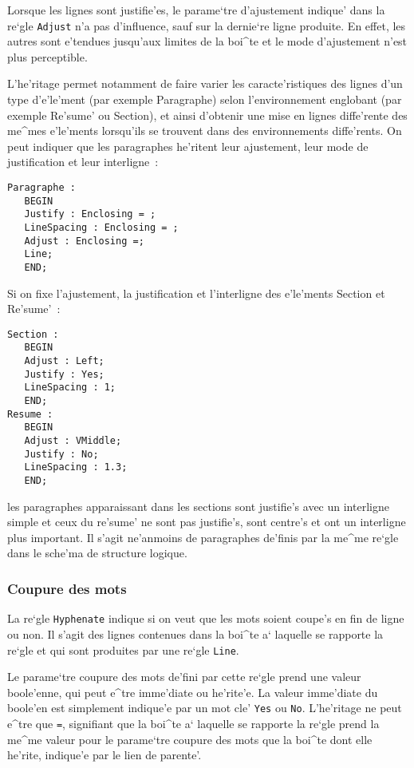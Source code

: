 {Lorsque les lignes sont justifie'es, le parame`tre d'ajustement indique' dans
la re`gle {\tt Adjust} n'a pas d'influence, sauf sur la dernie`re ligne
produite. En effet, les autres sont e'tendues jusqu'aux limites de la boi^te
et le mode d'ajustement n'est plus perceptible.

\begin{example}
L'he'ritage permet notamment de faire varier les caracte'ristiques des
lignes d'un type d'e'le'ment (par exemple Paragraphe) selon l'environnement
englobant (par exemple Re'sume' ou Section), et ainsi d'obtenir une mise
en lignes diffe'rente des me^mes e'le'ments lorsqu'ils se trouvent dans des
environnements diffe'rents. On peut indiquer que les paragraphes he'ritent
leur ajustement, leur mode de justification et leur interligne~:
\begin{verbatim}
Paragraphe :
   BEGIN
   Justify : Enclosing = ;
   LineSpacing : Enclosing = ;
   Adjust : Enclosing =;
   Line;
   END;
\end{verbatim}
Si on fixe l'ajustement, la justification et l'interligne des e'le'ments
Section et Re'sume'~:
\begin{verbatim}
Section :
   BEGIN
   Adjust : Left;
   Justify : Yes;
   LineSpacing : 1;
   END;
Resume :
   BEGIN
   Adjust : VMiddle;
   Justify : No;
   LineSpacing : 1.3;
   END;
\end{verbatim}
les paragraphes apparaissant dans les sections sont justifie's avec un
interligne simple et ceux du re'sume' ne sont pas justifie's, sont centre's
et ont un interligne plus important. Il s'agit ne'anmoins de paragraphes
de'finis par la me^me re`gle dans le sche'ma de structure logique.
\end{example}

\subsubsection{Coupure des mots}
\label{reglehyphenate}

La re`gle {\tt Hyphenate} indique si on veut que les mots soient coupe's
en fin de ligne ou non. Il s'agit des lignes contenues dans la boi^te a`
laquelle se rapporte la re`gle et qui sont produites par une re`gle {\tt Line}.

Le parame`tre coupure des mots de'fini
par cette re`gle prend une valeur boole'enne, qui peut e^tre imme'diate ou
he'rite'e. La valeur imme'diate du boole'en est simplement indique'e par un
mot cle' {\tt Yes} ou {\tt No}. L'he'ritage ne peut e^tre que {\tt =},
signifiant que la boi^te a` laquelle se rapporte la re`gle prend la me^me
valeur pour le parame`tre coupure des mots que la boi^te dont elle he'rite,
indique'e par le lien de parente'.

}
